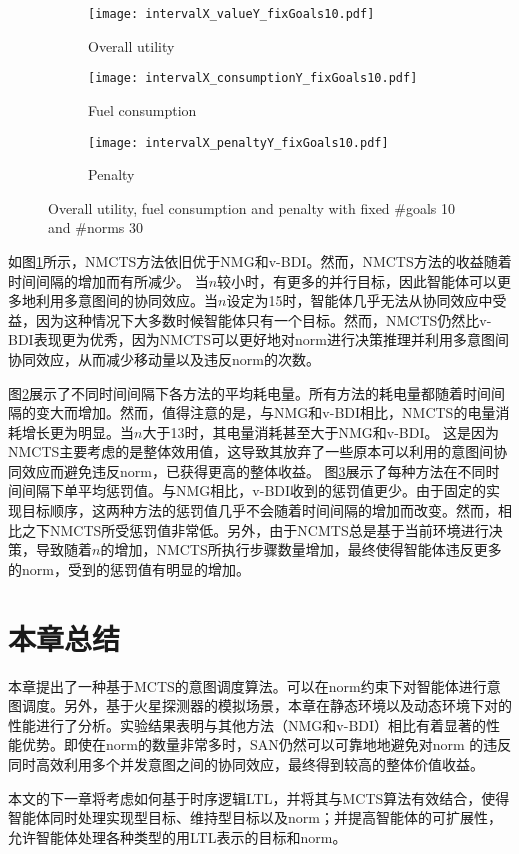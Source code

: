 \begin{figure}
\centering
\begin{subfigure}{.47\textwidth}
\centering
\texttt{[image: intervalX\_valueY\_fixGoals10.pdf]}
\captionsetup{justification=centering}
\caption{Overall utility}
\label{fig:intervalX_valueY_fixGoals10}
\end{subfigure}

\begin{subfigure}{.47\textwidth}
  \centering
  \texttt{[image: intervalX\_consumptionY\_fixGoals10.pdf]}
  \captionsetup{justification=centering}
  \caption{Fuel consumption}
  \label{fig:intervalX_consumptionY_fixGoals10}
\end{subfigure}
\begin{subfigure}{.47\textwidth}
  \centering
  \texttt{[image: intervalX\_penaltyY\_fixGoals10.pdf]}
  \captionsetup{justification=centering}
  \caption{Penalty}
  \label{fig:intervalX_penaltyY_fixGoals10}
\end{subfigure}
\captionsetup{justification=centering}
\caption{Overall utility, fuel consumption and penalty with fixed \#goals 10 and \#norms 30}
\label{fig:all_fixGoals10Norms30}
\end{figure}
如图\ref{fig:intervalX_valueY_fixGoals10}所示，NMCTS方法依旧优于NMG和v-BDI。然而，NMCTS方法的收益随着时间间隔的增加而有所减少。
当$n$较小时，有更多的并行目标，因此智能体可以更多地利用多意图间的协同效应。当$n$设定为15时，智能体几乎无法从协同效应中受益，因为这种情况下大多数时候智能体只有一个目标。然而，NMCTS仍然比v-BDI表现更为优秀，因为NMCTS可以更好地对norm进行决策推理并利用多意图间协同效应，从而减少移动量以及违反norm的次数。

图\ref{fig:intervalX_consumptionY_fixGoals10}展示了不同时间间隔下各方法的平均耗电量。所有方法的耗电量都随着时间间隔的变大而增加。然而，值得注意的是，与NMG和v-BDI相比，NMCTS的电量消耗增长更为明显。当$n$大于13时，其电量消耗甚至大于NMG和v-BDI。
这是因为NMCTS主要考虑的是整体效用值，这导致其放弃了一些原本可以利用的意图间协同效应而避免违反norm，已获得更高的整体收益。
图\ref{fig:intervalX_penaltyY_fixGoals10}展示了每种方法在不同时间间隔下单平均惩罚值。与NMG相比，v-BDI收到的惩罚值更少。由于固定的实现目标顺序，这两种方法的惩罚值几乎不会随着时间间隔的增加而改变。然而，相比之下NMCTS所受惩罚值非常低。另外，由于NCMTS总是基于当前环境进行决策，导致随着$n$的增加，NMCTS所执行步骤数量增加，最终使得智能体违反更多的norm，受到的惩罚值有明显的增加。
\section{本章总结}
本章提出了一种基于MCTS的意图调度算法\SAN 。\SAN 可以在norm约束下对智能体进行意图调度。另外，基于火星探测器的模拟场景，本章在静态环境以及动态环境下对\SAN 的性能进行了分析。实验结果表明\SAN 与其他方法（NMG和v-BDI）相比有着显著的性能优势。即使在norm的数量非常多时，SAN仍然可以可靠地地避免对norm
的违反同时高效利用多个并发意图之间的协同效应，最终得到较高的整体价值收益。

本文的下一章将考虑如何基于时序逻辑LTL，并将其与MCTS算法有效结合，使得智能体同时处理实现型目标、维持型目标以及norm；并提高智能体的可扩展性，允许智能体处理各种类型的用LTL表示的目标和norm。
